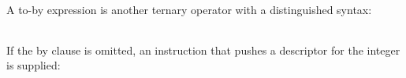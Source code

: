A to-by expression is another ternary operator with a distinguished syntax:

\begin{center}
\tabletail{}
\tablelasttail{}
\begin{supertabular}{|m{1.9073598in}|m{2.75596in}|}

\end{supertabular}
\end{center}

If the by clause is omitted, an instruction that pushes a descriptor
for the integer is supplied:

\begin{center}
\tabletail{}
\tablelasttail{}
\begin{supertabular}{|m{1.9073598in}|m{2.75596in}|}

\end{supertabular}
\end{center}

